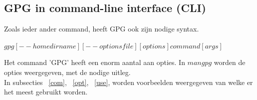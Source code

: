 \documentclass[12pt]{article}
\begin{document}
			\subsection{GPG in command-line interface (CLI)}\label{CLI}
				Zoals ieder ander command, heeft GPG ook zijn nodige syntax.\\
				\begin{center}
					$gpg  [--homedir name]  [--options file]  [options]  command  [args]$\\
				\end{center}
				Het command 'GPG' heeft een enorm aantal aan opties. In $man gpg$ worden de 							opties weergegeven, met de nodige uitleg.\\
				In subsecties ~\ref{com}, ~\ref{opt}, ~\ref{use}, worden voorbeelden weergegeven van 					welke er het meest gebruikt worden.\\
				
				\newpage
\end{document}
